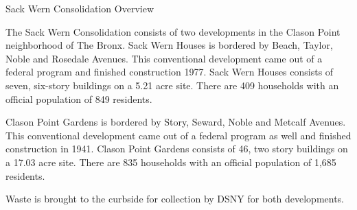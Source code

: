 Sack Wern Consolidation Overview

The Sack Wern Consolidation consists of two developments in the Clason Point neighborhood of The Bronx. Sack Wern Houses is bordered by Beach, Taylor, Noble and Rosedale Avenues. This conventional development came out of a federal program and finished construction 1977. Sack Wern Houses consists of seven, six-story buildings on a 5.21 acre site. There are 409 households with an official population of 849 residents. 

Clason Point Gardens is bordered by Story, Seward, Noble and Metcalf Avenues. This conventional development came out of a federal program as well and finished construction in 1941. Clason Point Gardens consists of 46, two story buildings on a 17.03 acre site. There are 835 households with an official population of 1,685 residents. 

Waste is brought to the curbside for collection by DSNY for both developments.